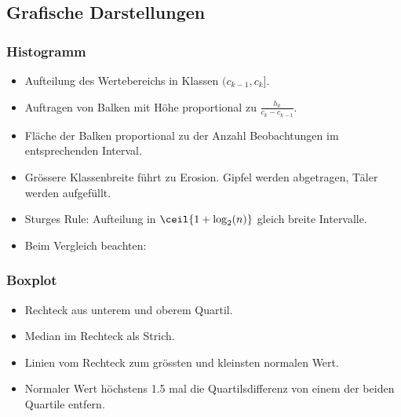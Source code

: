 \documentclass[8pt,a4paper]{scrartcl}
\begin{document}
\begin{multicols*}{3}



\subsection{Grafische Darstellungen}

\subsubsection{Histogramm}

\begin{itemize}
\item Aufteilung des Wertebereichs in Klassen $(c_{k-1},c_k]$.
\item Auftragen von Balken mit Höhe proportional zu $\frac{h_k}{c_k-c_{k-1}}$.
\item Fläche der Balken proportional zu der Anzahl Beobachtungen im entsprechenden Interval.
\item Grössere Klassenbreite führt zu Erosion. Gipfel werden abgetragen, Täler werden aufgefüllt.
\item Sturges Rule: Aufteilung in $\ceil{1+\log_2(n)}$ gleich breite Intervalle.
\item Beim Vergleich beachten: 
\end{itemize}


\subsubsection{Boxplot}

\begin{itemize}
\item Rechteck aus unterem und oberem Quartil.
\item Median im Rechteck als Strich.
\item Linien vom Rechteck zum grössten und kleinsten normalen Wert.
\item Normaler Wert höchstens 1.5 mal die Quartilsdifferenz von einem der beiden Quartile entfern.
\end{itemize}


\end{multicols*}
\end{document}
